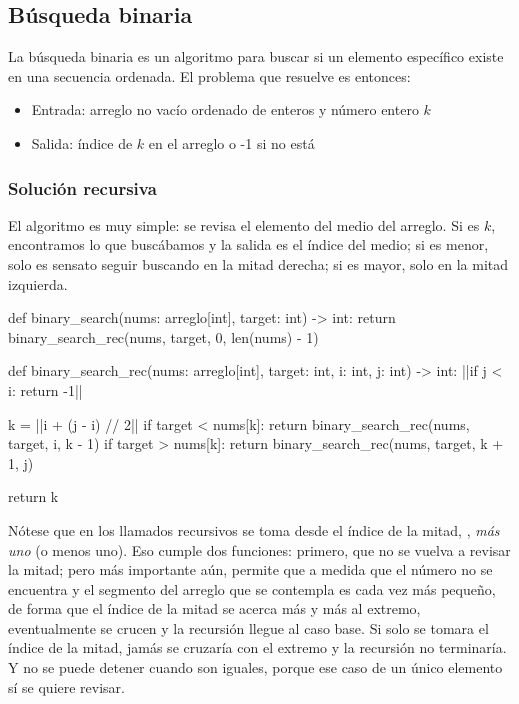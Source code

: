 \subsection{Búsqueda binaria}

La búsqueda binaria es un algoritmo para buscar si un elemento específico existe en una secuencia ordenada. El problema que resuelve es entonces:
\begin{itemize}
  \item Entrada: arreglo no vacío ordenado de enteros y número entero $k$
  \item Salida: índice de $k$ en el arreglo o -1 si no está
\end{itemize}

\subsubsection{Solución recursiva}

El algoritmo es muy simple: se revisa el elemento del medio del arreglo. Si es $k$, encontramos lo que buscábamos y la salida es el índice del medio; si es menor, solo es sensato seguir buscando en la mitad derecha; si es mayor, solo en la mitad izquierda.

\begin{pseudocode}
def binary_search(nums: arreglo[int], target: int) -> int:
    return binary_search_rec(nums, target, 0, len(nums) - 1)

def binary_search_rec(nums: arreglo[int], target: int, i: int, j: int) -> int:
    ||if j < i:
        return -1||

    k = ||i + (j - i) // 2||
    if target < nums[k]:
        return binary_search_rec(nums, target, i, k - 1)
    if target > nums[k]:
        return binary_search_rec(nums, target, k + 1, j)

    return k
\end{pseudocode}
\begin{annotations}
\end{annotations}

Nótese que en los llamados recursivos se toma desde el índice de la mitad, , \textit{más uno} (o menos uno). Eso cumple dos funciones: primero, que no se vuelva a revisar la mitad; pero más importante aún, permite que a medida que el número no se encuentra y el segmento del arreglo que se contempla es cada vez más pequeño, de forma que el índice de la mitad se acerca más y más al extremo, eventualmente se crucen y la recursión llegue al caso base. Si solo se tomara el índice de la mitad, jamás se cruzaría con el extremo y la recursión no terminaría. Y no se puede detener cuando son iguales, porque ese caso de un único elemento sí se quiere revisar.

